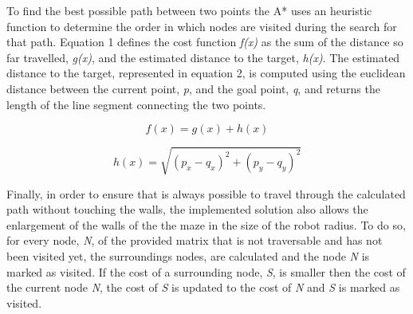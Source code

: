 \documentclass[oribibl]{llncs}
\begin{document}
To find the best possible path between two points the A* uses an heuristic function to determine the order in which nodes are visited during the search for that path. Equation 1 defines the cost function \textit{f(x)} as the sum of the distance so far travelled, \textit{g(x)}, and the estimated distance to the target, \textit{h(x)}. The estimated distance to the target, represented in equation 2, is computed using the euclidean distance between the current point, \textit{p}, and the goal point, \textit{q}, and returns the length of the line segment connecting the two points.

\begin{equation}
f(x) = g(x) + h(x)
\end{equation}

\begin{equation}
h(x) = \sqrt{(p_x - q_x)^2 + (p_y - q_y)^2}
\end{equation}

Finally, in order to ensure that is always possible to travel through the calculated path without touching the walls, the implemented solution also allows the enlargement of the walls of the the maze in the size of the robot radius. To do so, for every node, \textit{N}, of the provided matrix that is not traversable and has not been visited yet, the surroundings nodes, are calculated and the node \textit{N} is marked as visited. If the cost of a surrounding node, \textit{S}, is smaller then the cost of the current node \textit{N}, the cost of \textit{S} is updated to the cost of \textit{N} and \textit{S} is marked as visited.
\end{document}
